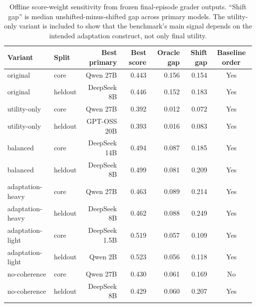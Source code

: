 \begin{table}[t]
  \centering
  \scriptsize
  \setlength{\tabcolsep}{4pt}
  \begin{tabular}{llrrrrc}
    \toprule
    Variant & Split & Best primary & Best score & Oracle gap & Shift gap & Baseline order \\
    \midrule
    original & core & Qwen 27B & 0.443 & 0.156 & 0.154 & Yes \\
    original & heldout & DeepSeek 8B & 0.446 & 0.152 & 0.183 & Yes \\
    utility-only & core & Qwen 27B & 0.392 & 0.012 & 0.072 & Yes \\
    utility-only & heldout & GPT-OSS 20B & 0.393 & 0.016 & 0.083 & Yes \\
    balanced & core & DeepSeek 14B & 0.494 & 0.087 & 0.185 & Yes \\
    balanced & heldout & DeepSeek 8B & 0.499 & 0.081 & 0.209 & Yes \\
    adaptation-heavy & core & Qwen 27B & 0.463 & 0.089 & 0.214 & Yes \\
    adaptation-heavy & heldout & DeepSeek 8B & 0.462 & 0.088 & 0.249 & Yes \\
    adaptation-light & core & DeepSeek 1.5B & 0.519 & 0.057 & 0.109 & Yes \\
    adaptation-light & heldout & Qwen 2B & 0.523 & 0.056 & 0.118 & Yes \\
    no-coherence & core & Qwen 27B & 0.430 & 0.061 & 0.169 & No \\
    no-coherence & heldout & DeepSeek 8B & 0.429 & 0.060 & 0.207 & Yes \\
    \bottomrule
  \end{tabular}
  \caption{Offline score-weight sensitivity from frozen final-episode grader
  outputs. ``Shift gap'' is median unshifted-minus-shifted gap across primary
  models. The utility-only variant is included to show that the benchmark's
  main signal depends on the intended adaptation construct, not only final
  utility.}
  \label{tab:scoresensitivity}
\end{table}
